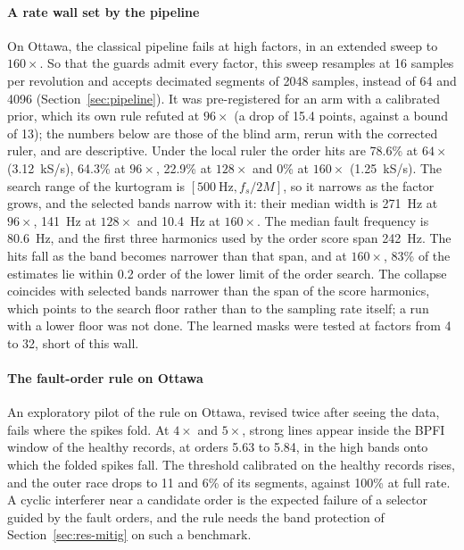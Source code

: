 \paragraph{A rate wall set by the pipeline} On Ottawa, the classical pipeline fails at high
factors, in an extended sweep to $160\times$. So that the guards admit every factor, this sweep
resamples at 16 samples per revolution and accepts decimated segments of 2048 samples, instead of 64
and 4096 (Section~\ref{sec:pipeline}). It was pre-registered for an arm with a calibrated prior,
which its own rule refuted at $96\times$ (a drop of 15.4 points, against a bound of 13); the numbers
below are those of the blind arm, rerun with the corrected ruler, and are descriptive. Under the
local ruler the order hits are 78.6\% at $64\times$ (3.12~kS/s), 64.3\% at $96\times$, 22.9\% at
$128\times$ and 0\% at $160\times$ (1.25~kS/s). The search range of the kurtogram is
$[500~\mathrm{Hz}, f_s/2M]$, so it narrows as the factor grows, and the selected bands narrow with
it: their median width is 271~Hz at $96\times$, 141~Hz at $128\times$ and 10.4~Hz at $160\times$.
The median fault frequency is 80.6~Hz, and the first three harmonics used by the order score span
242~Hz. The hits fall as the band becomes narrower than that span, and at $160\times$, 83\% of the
estimates lie within 0.2 order of the lower limit of the order search. The collapse coincides with
selected bands narrower than the span of the score harmonics, which points to the search floor
rather than to the sampling rate itself; a run with a lower floor was not done. The learned masks
were tested at factors from 4 to 32, short of this wall.

\paragraph{The fault-order rule on Ottawa} An exploratory pilot of the rule on Ottawa, revised twice
after seeing the data, fails where the spikes fold. At $4\times$ and $5\times$, strong lines appear
inside the BPFI window of the healthy records, at orders 5.63 to 5.84, in the high bands onto which
the folded spikes fall. The threshold calibrated on the healthy records rises, and the outer race
drops to 11 and 6\% of its segments, against 100\% at full rate. A cyclic interferer near a
candidate order is the expected failure of a selector guided by the fault orders, and the rule
needs the band protection of Section~\ref{sec:res-mitig} on such a benchmark.

